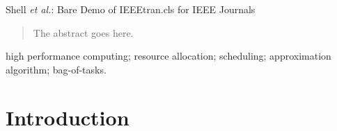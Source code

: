 \documentclass[journal]{IEEEtran}
\begin{document}
%
{Shell \MakeLowercase{\textit{et al.}}: Bare Demo of IEEEtran.cls for IEEE Journals}
% 











\maketitle

\begin{abstract}
The abstract goes here.
\end{abstract}

\begin{IEEEkeywords}
high performance computing; resource allocation;
scheduling; approximation algorithm; bag-of-tasks.
\end{IEEEkeywords}






%
\IEEEpeerreviewmaketitle


\section{Introduction}
\end{document}
